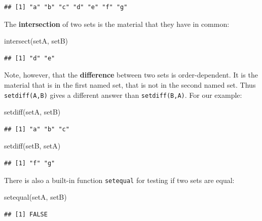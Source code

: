 \documentclass[
]{book}
\newenvironment{Shaded}{\begin{snugshade}}{\end{snugshade}}
\newcommand{\FunctionTok}[1]{\textcolor[rgb]{0.00,0.00,0.00}{#1}}
\newcommand{\NormalTok}[1]{#1}
\theoremstyle{definition}
\theoremstyle{definition}
\theoremstyle{definition}
\theoremstyle{definition}
\theoremstyle{remark}
\begin{document}
\begin{verbatim}
## [1] "a" "b" "c" "d" "e" "f" "g"
\end{verbatim}

The \textbf{intersection} of two sets is the material that they have in common:

\begin{Shaded}
\begin{Highlighting}[]
\FunctionTok{intersect}\NormalTok{(setA, setB)}
\end{Highlighting}
\end{Shaded}

\begin{verbatim}
## [1] "d" "e"
\end{verbatim}

Note, however, that the \textbf{difference} between two sets is order-dependent. It is the material that is in the first named set, that is not in the second named set. Thus \texttt{setdiff(A,B)} gives a different answer than \texttt{setdiff(B,A)}. For our example:

\begin{Shaded}
\begin{Highlighting}[]
\FunctionTok{setdiff}\NormalTok{(setA, setB)}
\end{Highlighting}
\end{Shaded}

\begin{verbatim}
## [1] "a" "b" "c"
\end{verbatim}

\begin{Shaded}
\begin{Highlighting}[]
\FunctionTok{setdiff}\NormalTok{(setB, setA)}
\end{Highlighting}
\end{Shaded}

\begin{verbatim}
## [1] "f" "g"
\end{verbatim}

There is also a built-in function \texttt{setequal} for testing if two sets are equal:

\begin{Shaded}
\begin{Highlighting}[]
\FunctionTok{setequal}\NormalTok{(setA, setB)}
\end{Highlighting}
\end{Shaded}

\begin{verbatim}
## [1] FALSE
\end{verbatim}
\end{document}
